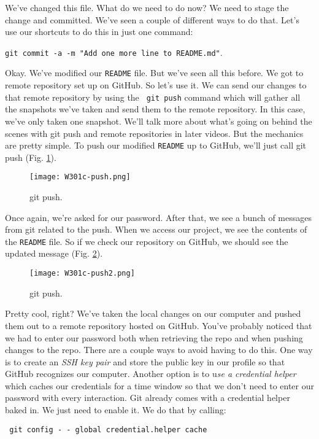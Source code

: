 We've changed this file. What do we need to do now? We need to stage the change and committed. We've seen a couple of different ways to do that. Let's use our shortcuts to do this in just one command:

\verb|git commit -a -m "Add one more line to README.md"|. 

Okay. We've modified our \verb|README| file. But we've seen all this before. We got to remote repository set up on GitHub. So let's use it. We can send our changes to that remote repository by using the \verb| git push| command which will gather all the snapshots we've taken and send them to the remote repository. In this case, we've only taken one snapshot. We'll talk more about what's going on behind the scenes with git push and remote repositories in later videos. But the mechanics are pretty simple. To push our modified \verb|README| up to GitHub, we'll just call git push (Fig. \ref{W301c-push}).

\begin{figure} 
	\caption{git push.}
	\centering
	\texttt{[image: W301c-push.png]}
	\label{W301c-push}
\end{figure}

Once again, we're asked for our password. After that, we see a bunch of messages from git related to the push. When we access our project, we see the contents of the \verb|README| file. So if we check our repository on GitHub, we should see the updated message (Fig. \ref{W301c-push2}).

\begin{figure} 
	\caption{git push.}
	\centering
	\texttt{[image: W301c-push2.png]}
	\label{W301c-push2}
\end{figure}

Pretty cool, right? We've taken the local changes on our computer and pushed them out to a remote repository hosted on GitHub. You've probably noticed that we had to enter our password both when retrieving the repo and when pushing changes to the repo. There are a couple ways to avoid having to do this. One way is to create an \textit{SSH key pair} and store the public key in our profile so that GitHub recognizes our computer. Another option is to u\textit{se a credential helper} which caches our credentials for a time window so that we don't need to enter our password with every interaction. Git already comes with a credential helper baked in. We just need to enable it. We do that by calling: 

\verb| git config - - global credential.helper cache |

